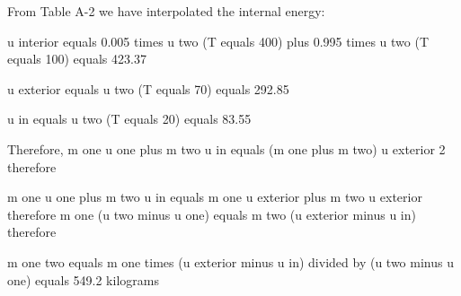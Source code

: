 From Table A-2 we have interpolated the internal energy:

u interior equals 0.005 times u two (T equals 400) plus 0.995 times u two (T equals 100) equals 423.37

u exterior equals u two (T equals 70) equals 292.85

u in equals u two (T equals 20) equals 83.55

Therefore, m one u one plus m two u in equals (m one plus m two) u exterior 2 therefore

m one u one plus m two u in equals m one u exterior plus m two u exterior therefore m one (u two minus u one) equals m two (u exterior minus u in) therefore

m one two equals m one times (u exterior minus u in) divided by (u two minus u one) equals 549.2 kilograms